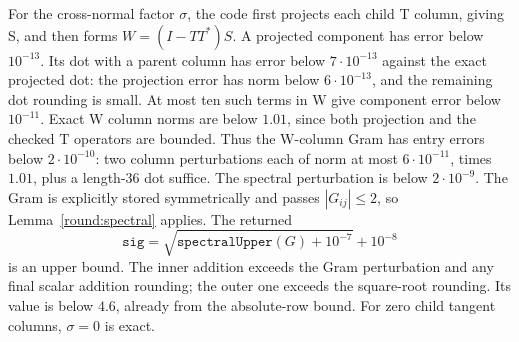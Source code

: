 For the cross-normal factor $\sigma$, the code first projects each
child T column, giving S, and then forms
$W=(I-TT^*)S$.  A projected component has error below $10^{-13}$.
Its dot with a parent column has error below $7\cdot10^{-13}$
against the exact projected dot: the projection error has norm
below $6\cdot10^{-13}$, and the remaining dot rounding is small.
At most ten such terms in W give component error below $10^{-11}$.
Exact W column norms are below $1.01$, since both projection and
the checked T operators are bounded.  Thus the W-column Gram has
entry errors below $2\cdot10^{-10}$: two column perturbations each
of norm at most $6\cdot10^{-11}$, times $1.01$, plus a length-36
dot suffice.  The spectral perturbation is below $2\cdot10^{-9}$.
The Gram is explicitly stored symmetrically and passes
$|G_{ij}|\le2$, so Lemma~\ref{round:spectral} applies.
The returned
\[
 \mathtt{sig}=\sqrt{\mathtt{spectralUpper}(G)+10^{-7}}+10^{-8}
\]
is an upper bound.  The inner addition exceeds the Gram perturbation
and any final scalar addition rounding; the outer one exceeds the
square-root rounding.  Its value is below $4.6$, already from the
absolute-row bound.  For zero child tangent columns, $\sigma=0$
is exact.

